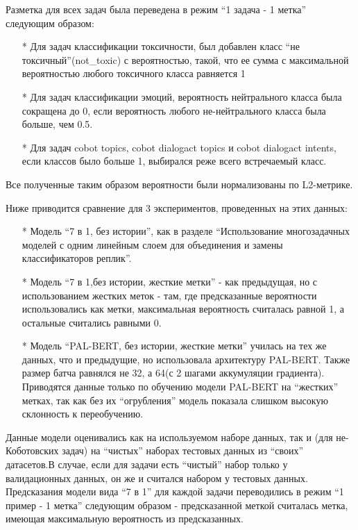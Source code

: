 Разметка для всех задач была переведена в режим “1 задача - 1 метка” следующим образом:
\begin{itemize}
\item[*] Для задач классификации токсичности, был добавлен класс “не токсичный”({not\_toxic}) с вероятностью, такой, что ее сумма с максимальной вероятностью любого токсичного класса равняется 1
\item[*] Для задач классификации эмоций, вероятность нейтрального класса была сокращена до 0, если вероятность любого не-нейтрального класса была больше, чем 0.5.
\item[*] Для задач cobot topics, cobot dialogact topics и cobot dialogact intents, если классов было больше 1, выбирался реже всего встречаемый класс.
\end{itemize}
Все полученные таким образом вероятности были нормализованы по L2-метрике.

Ниже приводится сравнение для 3 экспериментов, проведенных на этих данных:
\begin{itemize}
\item[*] Модель “7 в 1, без истории”, как в разделе “Использование многозадачных моделей с одним линейным слоем для объединения и замены классификаторов реплик”. 
\item[*] Модель “7 в 1,без истории, жесткие метки” - как предыдущая, но с использованием жестких меток - там, где предсказанные вероятности использовались как метки, максимальная вероятность считалась равной 1, а остальные считались равными 0. 
\item[*] Модель “PAL-BERT, без истории, жесткие метки” училась на тех же данных, что и предыдущие, но использовала архитектуру PAL-BERT. Также размер батча равнялся не 32, а 64(с 2 шагами аккумуляции градиента). Приводятся данные только по обучению модели PAL-BERT на “жестких” метках, так как без их “огрубления” модель показала слишком высокую склонность к переобучению.
\end{itemize}
Данные модели оценивались как на используемом наборе данных, так и  (для не-Коботовских задач) на “чистых” наборах тестовых данных из “своих” датасетов.В случае, если для задачи есть “чистый” набор только у валидационных данных, он же и считался набором у тестовых данных.
Предсказания модели вида “7 в 1” для каждой задачи переводились в режим “1 пример - 1 метка” следующим образом - предсказанной меткой считалась метка, имеющая максимальную вероятность из предсказанных.


